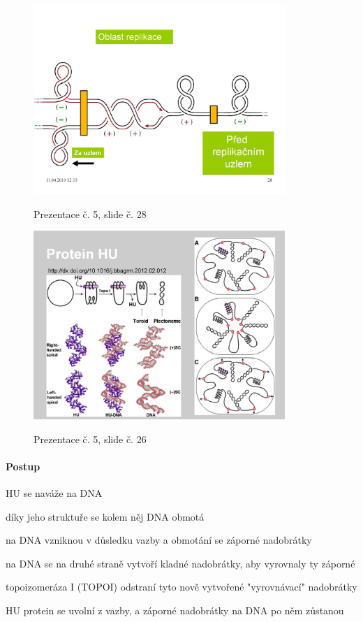 \documentclass[DIV=8]{scrreprt}
\begin{document}
\begin{figure}
    \caption{Prezentace č. 5, slide č. 28}
    \includegraphics[width=0.85\textwidth]{slides-5/slide-28.jpg}
    \centering
    \label{slides-5-slide-28}
\end{figure}
\begin{figure}
    \caption{Prezentace č. 5, slide č. 26}
    \includegraphics[width=0.85\textwidth]{slides-5/slide-26.jpg}
    \centering
    \label{slides-5-slide-26}
\end{figure}

\paragraph{Postup}
\begin{myEnumerate}[nosep]
    \item HU se naváže na DNA
\begin{myItemize}[nosep]
    \item díky jeho struktuře se kolem něj DNA obmotá
    \item na DNA vzniknou v důsledku vazby a obmotání se záporné nadobrátky
\end{myItemize}

    \item na DNA se na druhé straně vytvoří kladné nadobrátky, aby vyrovnaly ty záporné
    \item topoizomeráza I (TOPOI) odstraní tyto nově vytvořené "vyrovnávací" nadobrátky
    \item HU protein se uvolní z vazby, a záporné nadobrátky na DNA po něm zůstanou
\end{myEnumerate}
\end{document}
